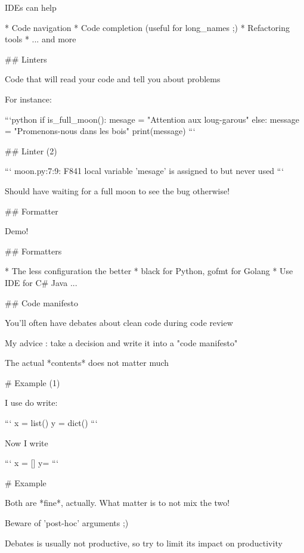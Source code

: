 IDEs can help

* Code navigation
* Code completion (useful for long_names ;)
* Refactoring tools
* ... and more

## Linters

Code that will read your code and tell you about problems

For instance:

```python
if is_full_moon():
    mesage = "Attention aux loug-garous"
else:
    message = "Promenons-nous dans les bois"
print(message)
```

## Linter (2)

```
moon.py:7:9: F841 local variable 'mesage' is assigned to but never used
```

Should have waiting for a full moon to see the bug otherwise!

## Formatter

Demo!

## Formatters

* The less configuration the better
* black for Python, gofmt for Golang
* Use IDE for C# Java
...

## Code manifesto

You'll often have debates about clean code during code review

My advice : take a decision and write it into a "code manifesto"

The actual *contents* does not matter much

# Example (1)

I use do write:

```
x = list()
y = dict()
```

Now I write

```
x = []
y= {}
```

# Example

Both are *fine*, actually. What matter is to not mix the two!

Beware of 'post-hoc' arguments ;)

Debates is usually not productive, so try to limit its impact
on productivity
